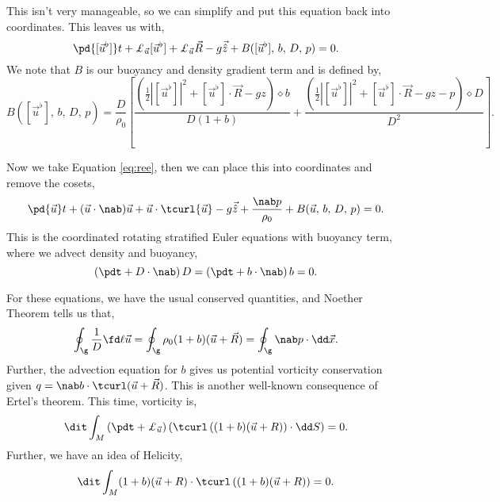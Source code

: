 This isn't very manageable, so we can simplify and put this equation back into coordinates. This leaves us with,
\begin{equation}
  \pd {[\vec u^\flat]} t + \pounds_{\vec u} [\vec u^\flat] + \pounds_{\vec u} \vec R - g\vec {\hat z} + B([\vec u^\flat],\, b,\, D,\, p) = 0.\label{eq:ree}
\end{equation}
We note that $B$ is our buoyancy and density gradient term and is defined by,
$$ B([\vec u^\flat],\, b,\, D,\, p) = \frac{D}{\rho_0}\left[ \frac{\left( \frac{1}{2}|[\vec u^\flat]|^2 + [\vec u^\flat] \cdot \vec R - gz \right)\diamond b}{D(1 + b)} + \frac{\left( \frac{1}{2}|[\vec u^\flat]|^2 + [\vec u^\flat] \cdot \vec R - gz - p \right)\diamond D}{D^2} \right]. $$

\noindent
Now we take Equation \eqref{eq:ree}, then we can place this into coordinates and remove the cosets,
$$ \pd {\vec u} t + ({\vec u} \cdot \nab) {\vec u} + {\vec u} \cdot \tcurl {\vec u} - g\vec{\hat z} + \frac{\nab p}{\rho_0} + B(\vec u,\, b,\, D,\, p) = 0. $$
This is the coordinated rotating stratified Euler equations with buoyancy term, where we advect density and buoyancy,
$$ \left(\pdt + D \cdot\nab\right) D  = \left(\pdt + b \cdot\nab\right) b = 0. $$

\noindent
For these equations, we have the usual conserved quantities, and Noether Theorem tells us that,
$$ \oint_{\g} \frac{1}{D}\fd \ell {\vec u} = \oint_{\g} \rho_0 (1 + b)(\vec u + \vec R)  = \oint_{\g} \nab p \cdot \dd \vec x. $$
Further, the advection equation for $b$ gives us potential vorticity conservation given $q = \nab b \cdot \tcurl(\vec u + \vec R)$. This is another well-known consequence of Ertel's theorem. This time, vorticity is,
$$ \dit \int_M \left( \pdt + \pounds_{\vec u} \right)\left( \tcurl\left((1 + b)(\vec u + R)\right) \cdot\dd S \right) = 0. $$
Further, we have an idea of Helicity,
$$ \dit \int_M (1 + b)(\vec u + R) \cdot \tcurl \left( (1 + b)(\vec u + R) \right) = 0. $$